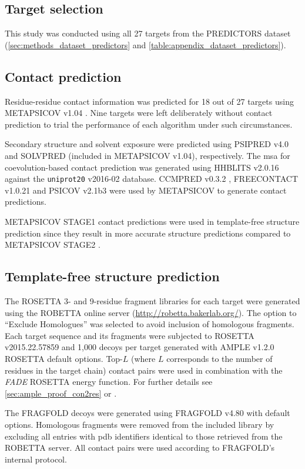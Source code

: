 \subsection{Target selection}
This study was conducted using all 27 targets from the PREDICTORS dataset (\cref{sec:methods_dataset_predictors} and \cref{table:appendix_dataset_predictors}).

\subsection{Contact prediction}
Residue-residue contact information was predicted for 18 out of 27 targets using METAPSICOV v1.04 \cite{Jones2015-vq}. Nine targets were left deliberately without contact prediction to trial the performance of each algorithm under such circumstances.

Secondary structure and solvent exposure were predicted using PSIPRED v4.0 \cite{Jones1999-ed} and SOLVPRED (included in METAPSICOV v1.04), respectively. The \gls{msa} for coevolution-based contact prediction was generated using HHBLITS v2.0.16 \cite{Remmert2011-kt} against the \texttt{uniprot20} v2016-02 database. CCMPRED v0.3.2 \cite{Seemayer2014-zp}, FREECONTACT v1.0.21 \cite{Kajan2014-bx} and PSICOV v2.1b3 \cite{Jones2012-ks} were used by METAPSICOV to generate contact predictions.

METAPSICOV STAGE1 contact predictions were used in template-free structure prediction since they result in more accurate structure predictions compared to METAPSICOV STAGE2 \cite{Jones2015-vq}.

\subsection{Template-free structure prediction} \label{sec:ample_saint2_modelling}
The ROSETTA 3- and 9-residue fragment libraries for each target were generated using the ROBETTA online server (\url{http://robetta.bakerlab.org/}). The option to ``Exclude Homologues'' was selected to avoid inclusion of homologous fragments. Each target sequence and its fragments were subjected to ROSETTA v2015.22.57859 \cite{Rohl2004-dj} and 1,000 decoys per target generated with AMPLE v1.2.0 ROSETTA default options. Top-$L$ (where $L$ corresponds to the number of residues in the target chain) contact pairs were used in combination with the \textit{FADE} ROSETTA energy function. For further details see \cref{sec:ample_proof_con2res} or \textcite{Michel2014-eg}.

The FRAGFOLD decoys were generated using FRAGFOLD v4.80 \cite{Jones2001-mc} with default options. Homologous fragments were removed from the included library by excluding all entries with \gls{pdb} identifiers identical to those retrieved from the ROBETTA server. All contact pairs were used according to FRAGFOLD's internal protocol.

